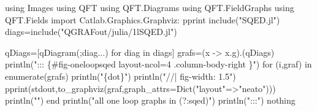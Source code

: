 \documentclass[
  11pt,
  a4paper,
  DIV=11,
  numbers=noendperiod,
  twoside]{scrreprt}
\newenvironment{Shaded}{\begin{snugshade}}{\end{snugshade}}
\newcommand{\BuiltInTok}[1]{\textcolor[rgb]{0.00,0.23,0.31}{#1}}
\newcommand{\ConstantTok}[1]{\textcolor[rgb]{0.56,0.35,0.01}{#1}}
\newcommand{\ControlFlowTok}[1]{\textcolor[rgb]{0.00,0.23,0.31}{#1}}
\newcommand{\FunctionTok}[1]{\textcolor[rgb]{0.28,0.35,0.67}{#1}}
\newcommand{\ImportTok}[1]{\textcolor[rgb]{0.00,0.46,0.62}{#1}}
\newcommand{\KeywordTok}[1]{\textcolor[rgb]{0.00,0.23,0.31}{#1}}
\newcommand{\NormalTok}[1]{\textcolor[rgb]{0.00,0.23,0.31}{#1}}
\newcommand{\OperatorTok}[1]{\textcolor[rgb]{0.37,0.37,0.37}{#1}}
\newcommand{\StringTok}[1]{\textcolor[rgb]{0.13,0.47,0.30}{#1}}
\DeclareRobustCommand{\[}{\begin{equation}}
\DeclareRobustCommand{\]}{\end{equation}}
\begin{document}
\begin{Shaded}
\begin{Highlighting}[]
\ImportTok{using} \BuiltInTok{Images}
\ImportTok{using} \BuiltInTok{QFT}
\ImportTok{using} \BuiltInTok{QFT.Diagrams}
\ImportTok{using} \BuiltInTok{QFT.FieldGraphs}
\ImportTok{using} \BuiltInTok{QFT.Fields}
\ImportTok{import}  \BuiltInTok{Catlab.Graphics.Graphviz}\NormalTok{: pprint}
\FunctionTok{include}\NormalTok{(}\StringTok{"SQED.jl"}\NormalTok{)}
\NormalTok{diags}\OperatorTok{=}\FunctionTok{include}\NormalTok{(}\StringTok{"QGRAFout/julia/1lSQED.jl"}\NormalTok{)}


\NormalTok{qDiags}\OperatorTok{=}\NormalTok{[}\FunctionTok{qDiagram}\NormalTok{(;diag}\OperatorTok{...}\NormalTok{) for diag }\KeywordTok{in}\NormalTok{ diags]}
\NormalTok{grafs}\OperatorTok{=}\NormalTok{(x }\OperatorTok{{-}\textgreater{}}\NormalTok{ x.g).(qDiags)}
\FunctionTok{println}\NormalTok{(}\StringTok{"::: \{\#fig{-}oneloopsqed  layout{-}ncol=4 .column{-}body{-}right \}"}\NormalTok{)}
\ControlFlowTok{for}\NormalTok{ (i,graf) }\KeywordTok{in} \FunctionTok{enumerate}\NormalTok{(grafs)}
\FunctionTok{println}\NormalTok{(}\StringTok{"\textasciigrave{}\textasciigrave{}\textasciigrave{}\{dot\}"}\NormalTok{)}
\FunctionTok{println}\NormalTok{(}\StringTok{"//| fig{-}width: 1.5"}\NormalTok{)}
    \FunctionTok{pprint}\NormalTok{(}\ConstantTok{stdout}\NormalTok{,}\FunctionTok{to\_graphviz}\NormalTok{(graf,graph\_attrs}\OperatorTok{=}\FunctionTok{Dict}\NormalTok{(}\StringTok{"layout"}\OperatorTok{=\textgreater{}}\StringTok{"neato"}\NormalTok{)))}
    \FunctionTok{println}\NormalTok{(}\StringTok{"\textasciigrave{}\textasciigrave{}\textasciigrave{}"}\NormalTok{)}
\ControlFlowTok{end}
\FunctionTok{println}\NormalTok{(}\StringTok{"all one loop graphs in (?:sqed)"}\NormalTok{)}
\FunctionTok{println}\NormalTok{(}\StringTok{":::"}\NormalTok{)}
\ConstantTok{nothing}
\end{Highlighting}
\end{Shaded}
\end{document}
